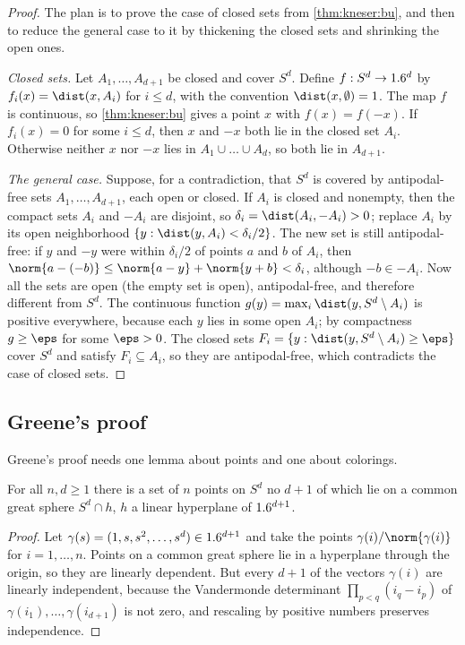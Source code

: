 \begin{refsection}
\begin{proof}
The plan is to prove the case of closed sets from \cref{thm:kneser:bu}, and then to reduce the general case to it by thickening the closed sets and shrinking the open ones.

\emph{Closed sets.} Let $A_1,\dots,A_{d+1}$ be closed and cover $S^d$. Define $f:S^d\to1.6^d$ by $f_i(x)=\dist(x,A_i)$ for $i\le d$, with the convention $\dist(x,\emptyset)=1$. The map $f$ is continuous, so \cref{thm:kneser:bu} gives a point $x$ with $f(x)=f(-x)$. If $f_i(x)=0$ for some $i\le d$, then $x$ and $-x$ both lie in the closed set $A_i$. Otherwise neither $x$ nor $-x$ lies in $A_1\cup\dots\cup A_d$, so both lie in $A_{d+1}$.

\emph{The general case.} Suppose, for a contradiction, that $S^d$ is covered by antipodal-free sets $A_1,\dots,A_{d+1}$, each open or closed. If $A_i$ is closed and nonempty, then the compact sets $A_i$ and $-A_i$ are disjoint, so $\delta_i=\dist(A_i,-A_i)>0$; replace $A_i$ by its open neighborhood $\{y:\dist(y,A_i)<\delta_i/2\}$. The new set is still antipodal-free: if $y$ and $-y$ were within $\delta_i/2$ of points $a$ and $b$ of $A_i$, then $\norm{a-(-b)}\le\norm{a-y}+\norm{y+b}<\delta_i$, although $-b\in-A_i$. Now all the sets are open (the empty set is open), antipodal-free, and therefore different from $S^d$. The continuous function $g(y)=\max_i\dist(y,S^d\setminus A_i)$ is positive everywhere, because each $y$ lies in some open $A_i$; by compactness $g\ge\eps$ for some $\eps>0$. The closed sets $F_i=\{y:\dist(y,S^d\setminus A_i)\ge\eps\}$ cover $S^d$ and satisfy $F_i\subseteq A_i$, so they are antipodal-free, which contradicts the case of closed sets.
\end{proof}

\subsection{Greene's proof}

Greene's proof needs one lemma about points and one about colorings.

\begin{lemma}\label{lem:kneser:gp}
For all $n,d\ge1$ there is a set of $n$ points on $S^d$ no $d+1$ of which lie on a common great sphere $S^d\cap h$, $h$ a linear hyperplane of $1.6^{d+1}$.
\end{lemma}

\begin{proof}
Let $\gamma(s)=(1,s,s^2,\dots,s^d)\in1.6^{d+1}$ and take the points $\gamma(i)/\norm{\gamma(i)}$ for $i=1,\dots,n$. Points on a common great sphere lie in a hyperplane through the origin, so they are linearly dependent. But every $d+1$ of the vectors $\gamma(i)$ are linearly independent, because the Vandermonde determinant $\prod_{p<q}(i_q-i_p)$ of $\gamma(i_1),\dots,\gamma(i_{d+1})$ is not zero, and rescaling by positive numbers preserves independence.
\end{proof}


\end{refsection}
